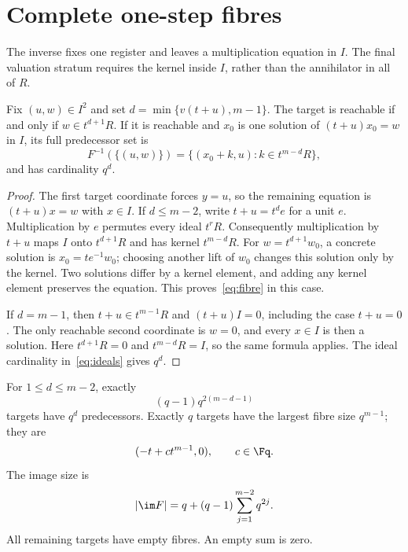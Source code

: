 \section{Complete one-step fibres}
\label{sec:fibres}

The inverse fixes one register and leaves a multiplication equation in
$I$. The final valuation stratum requires the kernel inside $I$, rather
than the annihilator in all of $R$.

\begin{theorem}
\label{thm:fibre}
Fix $(u,w)\in I^2$ and set $d=\min\{v(t+u),m-1\}$. The target is
reachable if and only if $w\in t^{d+1}R$. If it is reachable and $x_0$
is one solution of $(t+u)x_0=w$ in $I$, its full predecessor set is
\begin{equation}
 F^{-1}(\{(u,w)\})=
 \{(x_0+k,u):k\in t^{m-d}R\},
 \label{eq:fibre}
\end{equation}
and has cardinality $q^d$.
\end{theorem}

\begin{proof}
The first target coordinate forces $y=u$, so the remaining equation is
$(t+u)x=w$ with $x\in I$. If $d\leq m-2$, write $t+u=t^d e$ for a
unit $e$. Multiplication by $e$ permutes every ideal $t^rR$. Consequently
multiplication by $t+u$ maps $I$ onto $t^{d+1}R$ and has kernel
$t^{m-d}R$. For $w=t^{d+1}w_0$, a concrete solution is $x_0=te^{-1}w_0$;
choosing another lift of $w_0$ changes this solution only by the kernel.
Two solutions differ by a kernel element, and adding any kernel element
preserves the equation. This proves~\eqref{eq:fibre} in this case.

If $d=m-1$, then $t+u\in t^{m-1}R$ and $(t+u)I=0$, including the case
$t+u=0$. The only reachable second coordinate is $w=0$, and every $x\in I$
is then a solution. Here $t^{d+1}R=0$ and $t^{m-d}R=I$, so the same
formula applies. The ideal cardinality in~\eqref{eq:ideals} gives $q^d$.
\end{proof}

\begin{corollary}
\label{cor:fibrecensus}
For $1\leq d\leq m-2$, exactly
\begin{equation}
 (q-1)q^{2(m-d-1)}
 \label{eq:ordinarycount}
\end{equation}
targets have $q^d$ predecessors. Exactly $q$ targets have the largest
fibre size $q^{m-1}$; they are
\begin{equation}
 (-t+c t^{m-1},0),\qquad c\in\Fq.
 \label{eq:maximizers}
\end{equation}
The image size is
\begin{equation}
 |\im F|=q+(q-1)\sum_{j=1}^{m-2}q^{2j}.
 \label{eq:image}
\end{equation}
All remaining targets have empty fibres. An empty sum is zero.
\end{corollary}

